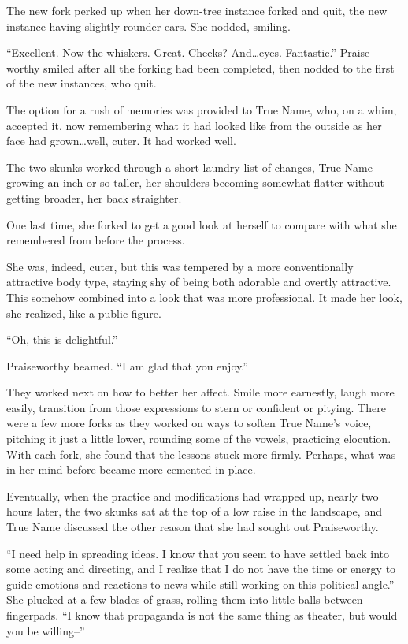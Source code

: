 The new fork perked up when her down-tree instance forked and quit, the new instance having slightly rounder ears. She nodded, smiling.

``Excellent. Now the whiskers. Great. Cheeks? And\ldots eyes. Fantastic.'' Praise worthy smiled after all the forking had been completed, then nodded to the first of the new instances, who quit.

The option for a rush of memories was provided to True Name, who, on a whim, accepted it, now remembering what it had looked like from the outside as her face had grown\ldots well, cuter. It had worked well.

The two skunks worked through a short laundry list of changes, True Name growing an inch or so taller, her shoulders becoming somewhat flatter without getting broader, her back straighter.

One last time, she forked to get a good look at herself to compare with what she remembered from before the process.

She was, indeed, cuter, but this was tempered by a more conventionally attractive body type, staying shy of being both adorable and overtly attractive. This somehow combined into a look that was more professional. It made her look, she realized, like a public figure.

``Oh, this is delightful.''

Praiseworthy beamed. ``I am glad that you enjoy.''

They worked next on how to better her affect. Smile more earnestly, laugh more easily, transition from those expressions to stern or confident or pitying. There were a few more forks as they worked on ways to soften True Name's voice, pitching it just a little lower, rounding some of the vowels, practicing elocution. With each fork, she found that the lessons stuck more firmly. Perhaps, what was in her mind before became more cemented in place.

Eventually, when the practice and modifications had wrapped up, nearly two hours later, the two skunks sat at the top of a low raise in the landscape, and True Name discussed the other reason that she had sought out Praiseworthy.

``I need help in spreading ideas. I know that you seem to have settled back into some acting and directing, and I realize that I do not have the time or energy to guide emotions and reactions to news while still working on this political angle.'' She plucked at a few blades of grass, rolling them into little balls between fingerpads. ``I know that propaganda is not the same thing as theater, but would you be willing--''

